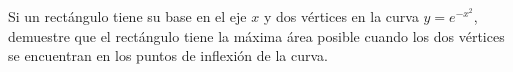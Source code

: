\item Si un rectángulo tiene su base en el eje $x$ y dos vértices en la curva $y = e^{-x^2}$, demuestre que el rectángulo tiene la máxima área posible cuando los dos vértices se encuentran en los puntos de inflexión de la curva.
